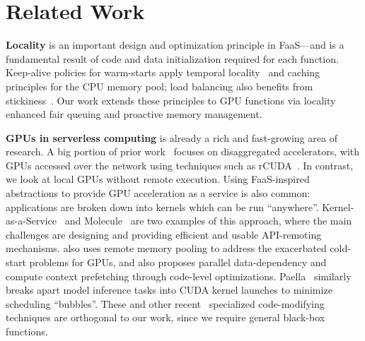 \vspace*{-0.5cm}
\section{Related Work}
\label{sec:related}
\vspace*{\subsecspace}

\noindent \textbf{Locality} is an important design and optimization principle in FaaS---and is a fundamental result of code and data initialization required for each function.
Keep-alive policies for warm-starts apply temporal locality~\cite{roy2022icebreaker, ebrahimi2024cold, vahidinia2022mitigating, shahrad2020serverless} and caching~\cite{faascache-asplos21, sundarrajan2017footprint} principles for the CPU memory pool; load balancing also benefits from stickiness~\cite{package-cristina-19, faaslb-hpdc22, abdi2023palette}.
Our work extends these principles to GPU functions via locality enhanced fair queuing and proactive memory management. 


\noindent \textbf{GPUs in serverless computing} is already a rich and fast-growing area of research. 
A big portion of prior work~\cite{naranjo2020accelerated, fingler2022dgsf, kim_gpu_2018} focuses on disaggregated accelerators, with GPUs accessed over the network using techniques such as rCUDA~\cite{duato2010rcuda}.
In contrast, we look at local GPUs without remote execution. 
Using FaaS-inspired abstractions to provide GPU acceleration as a service is also common: applications are broken down into kernels which can be run ``anywhere''.
Kernel-as-a-Service~\cite{pemberton2022kernel} and Molecule~\cite{du2022serverless} are two examples of this approach, where the main challenges are designing and providing efficient and usable API-remoting mechanisms. 
\cite{juan_reducing_2023} also uses remote memory pooling to address the exacerbated cold-start problems for GPUs, and also proposes parallel data-dependency and compute context prefetching through code-level optimizations. 
Paella~\cite{ng2023paella} similarly breaks apart model inference tasks into CUDA kernel launches to minimize scheduling ``bubbles''.
These and other recent~\cite{sage_zhao_towards_2024} specialized code-modifying techniques are orthogonal to our work, since we require general black-box functions.


